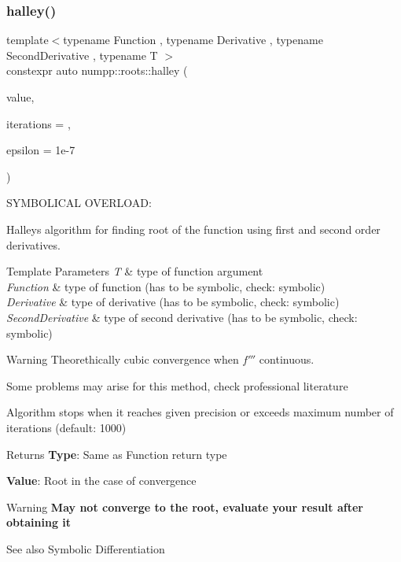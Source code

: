 \subsubsection{\texorpdfstring{halley()}{halley()}\hspace{0.1cm}{\footnotesize\ttfamily [1/2]}}
{\footnotesize\ttfamily template$<$typename Function , typename Derivative , typename Second\+Derivative , typename T $>$ \\
constexpr auto numpp\+::roots\+::halley (\begin{DoxyParamCaption}\item[{T \&\&}]{value,  }\item[{std\+::size\+\_\+t}]{iterations = {},  }\item[{const double}]{epsilon = {\ttfamily 1e-\/7} }\end{DoxyParamCaption})}

S\+Y\+M\+B\+O\+L\+I\+C\+AL O\+V\+E\+R\+L\+O\+AD\+:

Halley\textquotesingle{}s algorithm for finding root of the function using first and second order derivatives.


\begin{DoxyTemplParams}{Template Parameters}
{\em T} & type of function argument \\
\hline
{\em Function} & type of function (has to be symbolic, check\+: symbolic) \\
\hline
{\em Derivative} & type of derivative (has to be symbolic, check\+: symbolic) \\
\hline
{\em Second\+Derivative} & type of second derivative (has to be symbolic, check\+: symbolic)\\
\hline
\end{DoxyTemplParams}
\begin{DoxyWarning}{Warning}
Theorethically cubic convergence when $f'''$ continuous.

Some problems may arise for this method, check professional literature
\end{DoxyWarning}
Algorithm stops when it reaches given precision or exceeds maximum number of iterations (default\+: 1000)

\begin{DoxyReturn}{Returns}
{\bfseries Type}\+: Same as Function return type 

{\bfseries Value}\+: Root in the case of convergence
\end{DoxyReturn}
\begin{DoxyWarning}{Warning}
{\bfseries May not converge to the root, evaluate your result after obtaining it}
\end{DoxyWarning}
\begin{DoxySeeAlso}{See also}
Symbolic Differentiation
\end{DoxySeeAlso}
\mbox{\label{group__numpp__roots_gaa5dcba977340c78cd587fc7f9a3c0648}} 
